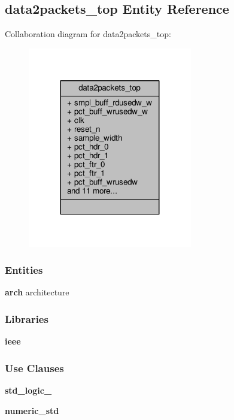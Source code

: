 \subsection{data2packets\+\_\+top Entity Reference}
\label{classdata2packets__top}


Collaboration diagram for data2packets\+\_\+top\+:\nopagebreak
\begin{figure}[H]
\begin{center}
\leavevmode
\includegraphics[width=203pt]{df/dcd/classdata2packets__top__coll__graph}
\end{center}
\end{figure}
\subsubsection*{Entities}
\begin{DoxyCompactItemize}
\item 
{\bf arch} architecture
\end{DoxyCompactItemize}
\subsubsection*{Libraries}
 \begin{DoxyCompactItemize}
\item 
{\bf ieee} 
\end{DoxyCompactItemize}
\subsubsection*{Use Clauses}
 \begin{DoxyCompactItemize}
\item 
{\bf std\+\_\+logic\+\_}   
\item 
{\bf numeric\+\_\+std}   
\end{DoxyCompactItemize}
